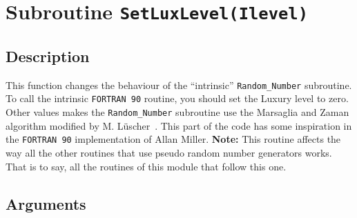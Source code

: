 \section{Subroutine \texttt{SetLuxLevel(Ilevel)}}

\subsection{Description}

This function changes the behaviour of the ``intrinsic''
\texttt{Random\_Number} subroutine. To call the intrinsic
\texttt{FORTRAN 90} routine, you should set the Luxury level to
zero. Other values makes the \texttt{Random\_Number} subroutine use the
Marsaglia and Zaman algorithm modified by
M. L\"uscher~\cite{Luscher:1993dy}. This part of the code has some
inspiration in the  \texttt{FORTRAN 90} implementation of Allan
Miller. \textbf{Note:} This routine affects the way all the other
routines that use pseudo random number generators works. That is to
say, all the routines of this module that follow this one.

\subsection{Arguments}

